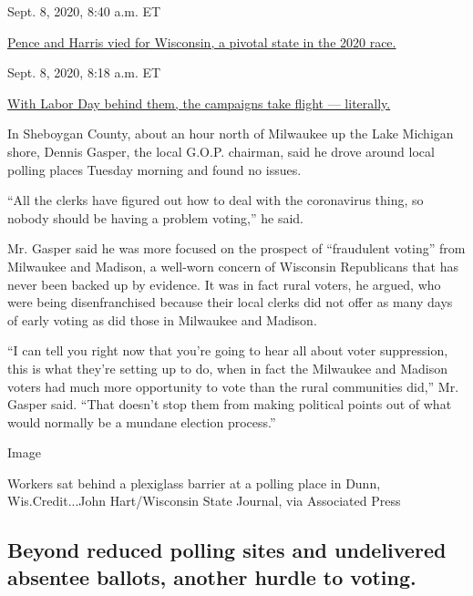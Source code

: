 Sept. 8, 2020, 8:40 a.m. ET

\href{https://www.nytimes3xbfgragh.onion/live/2020/09/08/us/trump-vs-biden\#pence-and-harris-vied-for-wisconsin-a-pivotal-state-in-the-2020-race}{Pence
and Harris vied for Wisconsin, a pivotal state in the 2020
race.}\href{https://www.nytimes3xbfgragh.onion/live/2020/09/08/us/trump-vs-biden\#with-labor-day-behind-them-the-campaigns-take-flight-literally}{}

Sept. 8, 2020, 8:18 a.m. ET

\href{https://www.nytimes3xbfgragh.onion/live/2020/09/08/us/trump-vs-biden\#with-labor-day-behind-them-the-campaigns-take-flight-literally}{With
Labor Day behind them, the campaigns take flight --- literally.}

In Sheboygan County, about an hour north of Milwaukee up the Lake
Michigan shore, Dennis Gasper, the local G.O.P. chairman, said he drove
around local polling places Tuesday morning and found no issues.

``All the clerks have figured out how to deal with the coronavirus
thing, so nobody should be having a problem voting,'' he said.

Mr. Gasper said he was more focused on the prospect of ``fraudulent
voting'' from Milwaukee and Madison, a well-worn concern of Wisconsin
Republicans that has never been backed up by evidence. It was in fact
rural voters, he argued, who were being disenfranchised because their
local clerks did not offer as many days of early voting as did those in
Milwaukee and Madison.

``I can tell you right now that you're going to hear all about voter
suppression, this is what they're setting up to do, when in fact the
Milwaukee and Madison voters had much more opportunity to vote than the
rural communities did,'' Mr. Gasper said. ``That doesn't stop them from
making political points out of what would normally be a mundane election
process.''

Image

Workers sat behind a plexiglass barrier at a polling place in Dunn,
Wis.Credit...John Hart/Wisconsin State Journal, via Associated Press

\hypertarget{beyond-reduced-polling-sites-and-undelivered-absentee-ballots-another-hurdle-to-voting}{%
\subsection{Beyond reduced polling sites and undelivered absentee
ballots, another hurdle to
voting.}\label{beyond-reduced-polling-sites-and-undelivered-absentee-ballots-another-hurdle-to-voting}}

